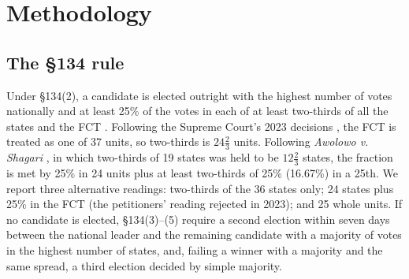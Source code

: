 \documentclass[preprint,12pt,authoryear]{elsarticle}
\begin{document}
\section{Methodology}
\label{sec:method}

\subsection{The \S134 rule}
Under \S134(2), a candidate is elected outright with the highest number of votes nationally and at least 25\% of the votes in each of at least two-thirds of all the states and the FCT \citep{Constitution1999}. Following the Supreme Court's 2023 decisions \citep{ObiINEC2023}, the FCT is treated as one of 37 units, so two-thirds is $24\tfrac{2}{3}$ units. Following \textit{Awolowo v. Shagari} \citep{AwolowoShagari1979}, in which two-thirds of 19 states was held to be $12\tfrac{2}{3}$ states, the fraction is met by 25\% in 24 units plus at least two-thirds of 25\% (16.67\%) in a 25th. We report three alternative readings: two-thirds of the 36 states only; 24 states plus 25\% in the FCT (the petitioners' reading rejected in 2023); and 25 whole units. If no candidate is elected, \S134(3)--(5) require a second election within seven days between the national leader and the remaining candidate with a majority of votes in the highest number of states, and, failing a winner with a majority and the same spread, a third election decided by simple majority.
\end{document}
